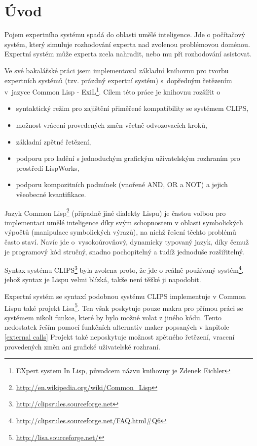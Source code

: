 \section{Úvod}

Pojem expertního systému spadá do oblasti umělé inteligence. Jde o počítačový
systém, který simuluje rozhodování experta nad zvolenou problémovou doménou.
Expertní systém může experta zcela nahradit, nebo mu při rozhodování asistovat.

Ve své bakalářské práci \cite{bakalarka} jsem implementoval základní knihovnu
pro tvorbu expertních systémů (tzv. prázdný expertní systém) s~dopředným
řetězením v~jazyce Common Lisp - ExiL\footnote{EXpert system In Lisp, původcem
  názvu knihovny je Zdenek Eichler}. Cílem této práce je knihovnu rozšířit o
\begin{itemize}
  \item syntaktický režim pro zajištění přiměřené kompatibility se systémem
    CLIPS,
  \item možnost vrácení provedených změn včetně odvozovacích kroků,
  \item základní zpětné řetězení,
  \item podporu pro ladění s jednoduchým grafickým uživatelským rozhraním pro
    prostředí LispWorks\texttrademark,
  \item podporu kompozitních podmínek (vnořené AND, OR a NOT) a jejich všeobecné
    kvantifikace.
\end{itemize}

Jazyk Common Lisp\footnote{\url{http://en.wikipedia.org/wiki/Common\_Lisp}}
(případně jiné dialekty Lispu) je častou volbou pro implementaci umělé
inteligence díky svým schopnostem v oblasti symbolických výpočtů (manipulace
symbolických výrazů), na nichž řešení těchto problémů často staví. Navíc jde
o~vysokoúrovňový, dynamicky typovaný jazyk, díky čemuž je programový kód
stručný, snadno pochopitelný a tudíž jednoduše rozšiřitelný.

Syntax systému CLIPS\footnote{\url{http://clipsrules.sourceforge.net}} byla
zvolena proto, že jde o reálně používaný
systém\footnote{\url{http://clipsrules.sourceforge.net/FAQ.html\#Q6}}, jehož
syntax je Lispu velmi blízká, takže není těžké ji napodobit.

Expertní systém se syntaxí podobnou systému CLIPS implementuje v Common Lispu
také projekt Lisa\footnote{\url{http://lisa.sourceforge.net/}}. Ten však
poskytuje pouze makra pro přímou práci se systémem nikoli funkce, které by bylo
možné volat z jiného kódu. Tento nedostatek řeším pomocí funkčních alternativ
maker popsaných v kapitole \ref{external calls} Projekt také neposkytuje možnost
zpětného řetězení, vracení provedených změn ani grafické uživatelské rozhraní.

